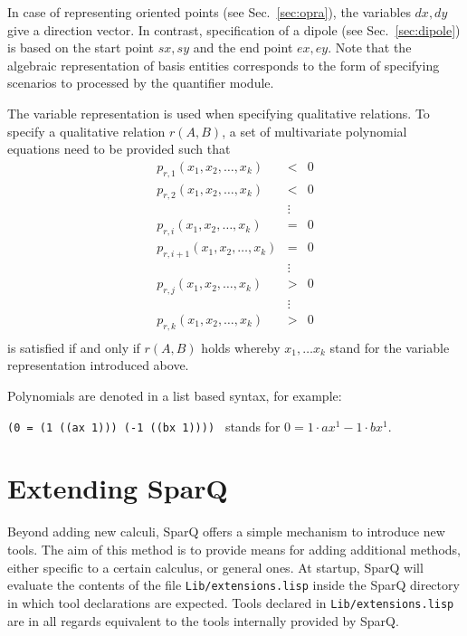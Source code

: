 \documentclass[headsepline]{scrreprt}
\theoremstyle{definition}
\newcommand{\engine}{SparQ}
\begin{document}
In case of representing oriented points (see Sec.~\ref{sec:opra}), the variables $dx,dy$ 
give a direction vector. In contrast, specification of a dipole (see Sec.~\ref{sec:dipole})  is based
on the start point $sx,sy$ and the end point $ex,ey$. Note that the algebraic representation of basis entities corresponds to the form of specifying scenarios to processed by the quantifier module.


The variable representation is used when specifying qualitative relations. 
To specify a qualitative relation $r(A,B)$, a set of multivariate polynomial equations need to be provided such that
\begin{eqnarray*}
	p_{r,1}(x_1, x_2, \ldots, x_k) &<& 0\\
	p_{r,2}(x_1, x_2, \ldots, x_k) &<& 0\\
		&\vdots&\\
	p_{r,i}(x_1, x_2, \ldots, x_k) &=& 0\\
	p_{r,i+1}(x_1, x_2, \ldots, x_k) &=& 0\\
		&\vdots&\\
	p_{r,j}(x_1, x_2, \ldots, x_k) &>& 0\\
		&\vdots&\\
	p_{r,k}(x_1, x_2, \ldots, x_k) &>& 0\\
\end{eqnarray*}
is satisfied if and only if $r(A,B)$ holds whereby $x_1, \ldots x_k$ stand for the variable representation introduced above.

Polynomials are denoted in a list based syntax, for example:

{\tt (0 = (1 ((ax 1))) (-1 ((bx 1)))) } stands for $0 = 1\cdot ax^1 - 1\cdot bx^1$. 

\section{Extending \engine{}}\label{sec:extending}
Beyond adding new calculi, \engine{} offers a simple mechanism to introduce new tools. The aim of this method is to provide means for adding additional methods, either specific to a certain calculus, or general ones. 
At startup, \engine{} will evaluate the contents of the file {\tt Lib/extensions.lisp} inside the \engine{} directory in which tool declarations are expected. Tools declared in {\tt Lib/extensions.lisp} are in all regards equivalent to the tools internally provided by \engine{}.
\end{document}
